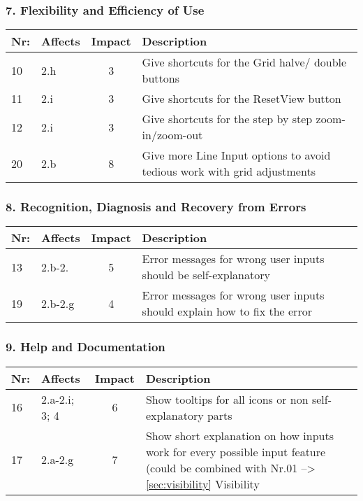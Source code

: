 \subsubsection*{7. Flexibility and Efficiency of Use}
        \begin{tabular}{l | p{} | c | p{}}
        Nr: & Affects & Impact & Description \\ \hline
        10 & 2.h & 3 & Give shortcuts for the Grid halve/ double buttons\\ \hline
        11 & 2.i  & 3 & Give shortcuts for the ResetView button\\ \hline
        12 & 2.i & 3 & Give shortcuts for the step by step zoom-in/zoom-out\\ \hline
        20 & 2.b & 8 & Give more Line Input options to avoid tedious work with grid adjustments\\ \hline
        \end{tabular}

\subsubsection*{8. Recognition, Diagnosis and Recovery from Errors}
        \begin{tabular}{l | p{} | c | p{}}
        Nr: & Affects & Impact & Description \\ \hline
        13 & 2.b-2. & 5 & Error messages for wrong user inputs should be self-explanatory\\ \hline
        19 & 2.b-2.g & 4 & Error messages for wrong user inputs should explain how to fix the error\\ \hline
        \end{tabular}

\subsubsection*{9. Help and Documentation}

        \begin{tabular}{l | p{} | c | p{}}
        Nr: & Affects & Impact & Description \\ \hline
        16 & 2.a-2.i; 3; 4 & 6 & Show tooltips for all icons or non self-explanatory parts\\ \hline 
        17 & 2.a-2.g & 7 & Show short explanation on how inputs work for every possible input feature (could be combined with Nr.01 --> \ref{sec:visibility} Visibility\\ \hline
        \end{tabular}

